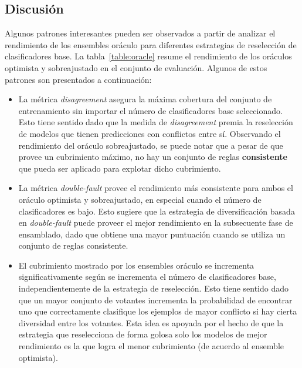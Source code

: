 \subsection{Discusión}\label{section:discussion-first-phase}

Algunos patrones interesantes pueden ser observados a partir de analizar el rendimiento de los ensembles oráculo para diferentes estrategias de reselección de clasificadores base.
La tabla~\ref{table:oracle} resume el rendimiento de los oráculos optimista y sobreajustado en el conjunto de evaluación.
Algunos de estos patrones son presentados a continuación:

\begin{itemize}
    \item 
    La métrica \emph{disagreement} asegura la máxima cobertura del conjunto de entrenamiento sin importar el número de clasificadores base seleccionado.
    Esto tiene sentido dado que la medida de \emph{disagreement} premia la reselección de modelos que tienen predicciones con conflictos entre sí.
    Observando el rendimiento del oráculo sobreajustado, se puede notar que a pesar de que provee un cubrimiento máximo, no hay un conjunto de reglas \textbf{consistente} que pueda ser aplicado para explotar dicho cubrimiento.
    
    \item
    La métrica \emph{double-fault} provee el rendimiento más consistente para ambos el oráculo optimista y sobreajustado, en especial cuando el número de clasificadores es bajo.
    Esto sugiere que la estrategia de diversificación basada en \emph{double-fault} puede proveer el mejor rendimiento en la subsecuente fase de ensamblado, dado que obtiene una mayor puntuación cuando se utiliza un conjunto de reglas consistente. 
    
    \item
    El cubrimiento mostrado por los ensembles oráculo se incrementa significativamente según se incrementa el número de clasificadores base, independientemente de la estrategia de reselección.
    Esto tiene sentido dado que un mayor conjunto de votantes incrementa la probabilidad de encontrar uno que correctamente clasifique los ejemplos de mayor conflicto si hay cierta diversidad entre los votantes.
    Esta idea es apoyada por el hecho de que la estrategia que reselecciona de forma golosa solo los modelos de mejor rendimiento es la que logra el menor cubrimiento (de acuerdo al ensemble optimista).
\end{itemize}

